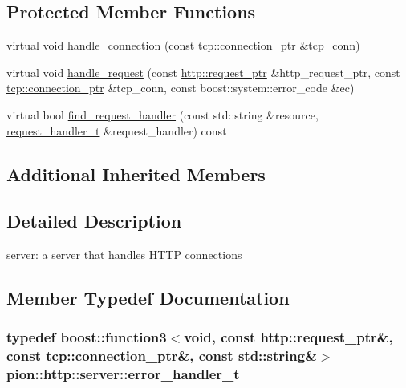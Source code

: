 \subsection*{Protected Member Functions}
\begin{DoxyCompactItemize}
\item 
virtual void \hyperlink{classpion_1_1http_1_1server_a7f15a7abd45216a7e03e3f3b5c0b83c1}{handle\-\_\-connection} (const \hyperlink{namespacepion_1_1tcp_a6c9b7497068009f6d81d95ec0b0627d6}{tcp\-::connection\-\_\-ptr} \&tcp\-\_\-conn)
\item 
virtual void \hyperlink{classpion_1_1http_1_1server_aadca54c44a0136f541e2f2e95e2c8084}{handle\-\_\-request} (const \hyperlink{namespacepion_1_1http_ace432b70a9459d50ff4969a7a47f0ccb}{http\-::request\-\_\-ptr} \&http\-\_\-request\-\_\-ptr, const \hyperlink{namespacepion_1_1tcp_a6c9b7497068009f6d81d95ec0b0627d6}{tcp\-::connection\-\_\-ptr} \&tcp\-\_\-conn, const boost\-::system\-::error\-\_\-code \&ec)
\item 
virtual bool \hyperlink{classpion_1_1http_1_1server_a2a0e8e0c21438a9928e680cb0d94430c}{find\-\_\-request\-\_\-handler} (const std\-::string \&resource, \hyperlink{classpion_1_1http_1_1server_a9a5ae02baccb5646a5a76b99dc44df6e}{request\-\_\-handler\-\_\-t} \&request\-\_\-handler) const 
\end{DoxyCompactItemize}
\subsection*{Additional Inherited Members}


\subsection{Detailed Description}
server\-: a server that handles H\-T\-T\-P connections 

\subsection{Member Typedef Documentation}
\hypertarget{classpion_1_1http_1_1server_abc3b778d656bfb9dfa0b63315b5369f9}{
\subsubsection[{error\-\_\-handler\-\_\-t}]{\setlength{\rightskip}{0pt plus 5cm}typedef boost\-::function3$<$void, const {\bf http\-::request\-\_\-ptr}\&, const {\bf tcp\-::connection\-\_\-ptr}\&, const std\-::string\&$>$ {\bf pion\-::http\-::server\-::error\-\_\-handler\-\_\-t}}}\label{classpion_1_1http_1_1server_abc3b778d656bfb9dfa0b63315b5369f9}



